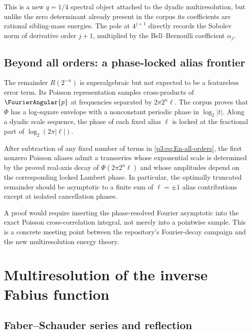 \documentclass[11pt]{article}
\theoremstyle{definition}
\theoremstyle{remark}
\begin{document}
This is a new $q=1/4$ spectral object attached to the dyadic
multiresolution, but unlike the zero determinant already present in the corpus
its coefficients are rational sibling-mass energies.  The pole at $4^{j+1}$
directly records the Sobolev norm of derivative order $j+1$, multiplied by the
Bell--Bernoulli coefficient $\alpha_j$.

\subsection{Beyond all orders: a phase-locked alias frontier}

The remainder $R(2^{-n})$ is superalgebraic but not expected to be a featureless
error term.  Its Poisson representation samples cross-products of
$\FourierAngular{p}$ at frequencies separated by $2\pi2^n\ell$.  The corpus proves that
$\Phi$ has a log-square envelope with a nonconstant periodic phase in
$\log_2|t|$.  Along a dyadic scale sequence, the phase of each fixed alias
$\ell$ is locked at the fractional part of $\log_2(2\pi|\ell|)$.

\begin{conjecture}
\label{p3:conj:Haar-alias}
After subtraction of any fixed number of terms in
\eqref{p3:eq:En-all-orders}, the first nonzero Poisson aliases admit a transseries
whose exponential scale is determined by the proved real-axis decay of
$\Phi(2\pi2^n\ell)$ and whose amplitudes depend on the corresponding locked
Lambert phase.  In particular, the optimally truncated remainder should be
asymptotic to a finite sum of $\ell=\pm1$ alias contributions except at isolated
cancellation phases.
\end{conjecture}

A proof would require inserting the phase-resolved Fourier asymptotic into the
exact Poisson cross-correlation integral, not merely into a pointwise sample.
This is a concrete meeting point between the repository's Fourier-decay campaign
and the new multiresolution energy theory.

\section{Multiresolution of the inverse Fabius function}
\label{p3:sec:inverse-multiresolution}

\subsection{Faber--Schauder series and reflection}
\end{document}
